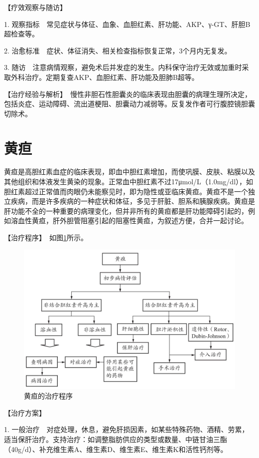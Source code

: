 【疗效观察与随访】

1.
观察指标　常见症状与体征、血象、血胆红素、肝功能、AKP、γ-GT、肝胆B超检查等。

2. 治愈标准　症状、体征消失、相关检查指标恢复正常，3个月内无复发。

3.
随访　注意病情观察，避免术后并发症的发生。内科保守治疗无效或加重时采取外科治疗。定期复查AKP、血胆红素、肝功能及胆肺B超等。

【治疗经验与解析】　慢性非胆石性胆囊炎的临床表现由胆囊的病理生理所决定，包括炎症、运动障碍、流出道梗阻、胆囊动力减弱等。反复发作者可行腹腔镜胆囊切除术。

\section{黄疸}

黄疸是高胆红素血症的临床表现，即血中胆红素增加，而使巩膜、皮肤、粘膜以及其他组织和体液发生黄染的现象。正常血中胆红素不过17μmol/L（1.0mg/dl），如胆红素超过正常值而肉眼仍未能察见时，即为隐性或亚临床黄疸。黄疸不是一个独立疾病，而是许多疾病的一种症状和体征，多见于肝脏、胆系和胰腺疾病。黄疸是肝功能不全的一种重要的病理变化，但并非所有的黄疸都是肝功能障碍引起的，例如溶血性黄疸，肝外胆管阻塞引起的阻塞性黄疸，为叙述方便，合并一起讨论。

【治疗程序】　如图\ref{fig3-21-1}所示。

\begin{figure}[!htbp]
 \centering
 \includegraphics{./images/Image00114.jpg}
 \captionsetup{justification=centering}
 \caption{黄疸的治疗程序}
 \label{fig3-21-1}
  \end{figure} 

【治疗方案】

1.
一般治疗　对症处理，休息，避免肝损因素，如某些特殊药物、酒精、劳累，适当保肝治疗。支持治疗：如调整脂肪供应的类型或数量、中链甘油三酯（40g/d）、补充维生素A、维生素D、维生素E、维生素K和活性钙剂等。

